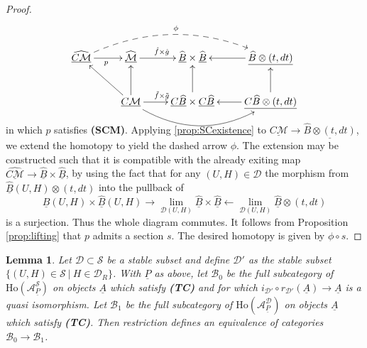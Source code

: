 \documentclass[12pt,a4paper]{article}
\newtheorem{lem}[thm]{Lemma}
\theoremstyle{definition}
\begin{document}
\begin{proof}
\[\xymatrix{
\widehat{\underline{C\mathcal{M}}}\ar[r]_p\ar@/^2.0pc/@{-->}[rrr]^\phi& \widehat{\underline{\mathcal{M}}} \ar[r]^{\hat{f}\times\hat{g}}& \widehat{\underline{B}}\times\widehat{\underline{B}}& \ar[l] \underline{\widehat{B}\otimes (t,dt)}\\
 & \underline{C\mathcal{M}}\ar[lu]\ar[u] \ar[r]^{\tilde{f}\times\tilde{g}} \ar@/_2.0pc/[rr] &\underline{C\widehat{B}}\times \underline{C\widehat{B}}\ar[u]& \ar[l] \underline{C\widehat{B}\otimes (t,dt)}\ar[u]
}\]\vspace{0.4cm}

\noindent in which $p$ satisfies \textbf{(SCM)}. Applying \ref{prop:SCexistence} to $\underline{C\mathcal{M}}\rightarrow \underline{\widehat{B}\otimes (t,dt)}$, we extend the homotopy to yield the dashed arrow $\phi$. The extension may be constructed  such that it is compatible with the already exiting map $\widehat{\underline{C\mathcal{M}}}\rightarrow \underline{\widehat{B}}\times\underline{\widehat{B}}$, by using the fact that for any $(U,H)\in \mathcal{D}$ the morphism from $\underline{\widehat{B}}(U,H)\otimes (t,dt)$ into the pullback of \[\underline{\widehat{B}}(U,H)\times\underline{\widehat{B}}(U,H)\rightarrow \lim_{\mathcal{D}(U,H)} \widehat{\underline{B}}\times\widehat{\underline{B}}\leftarrow \lim_{\mathcal{D}(U,H)}\widehat{\underline{B}}\otimes (t,dt)\] is a surjection. Thus the whole diagram commutes. It follows from Proposition \ref{prop:lifting} that $p$ admits a section $s$. The desired homotopy is given by $\phi\circ s$.
\end{proof}

\begin{lem}\label{lem:restrictiongalore}
Let $\mathcal{D}\subset \mathcal{S}$ be a stable subset and define $\mathcal{D'}$ as the stable subset $\{(U,H)\in \mathcal{S}~|~ H\in \mathcal{D}_R\}$. With $\underline{P}$ as above, let $\mathcal{B}_0$ be the full subcategory of $\mathrm{Ho}(\mathcal{A}^\mathcal{S}_{\underline{P}})$ on objects $\underline{A}$ which satisfy \textbf{(TC)} and for which $i_{\mathcal{D}'}\circ r_{\mathcal{D}'}(\underline{A})\rightarrow \underline{A}$ is a quasi isomorphism.
Let $\mathcal{B}_1$ be the full subcategory of $\mathrm{Ho}(\mathcal{A}^\mathcal{D}_{\underline{P}})$ on objects $\underline{A}$ which satisfy \textbf{(TC)}. Then restriction defines an equivalence of categories $\mathcal{B}_0\rightarrow\mathcal{B}_1$.
\end{lem}
\end{document}
